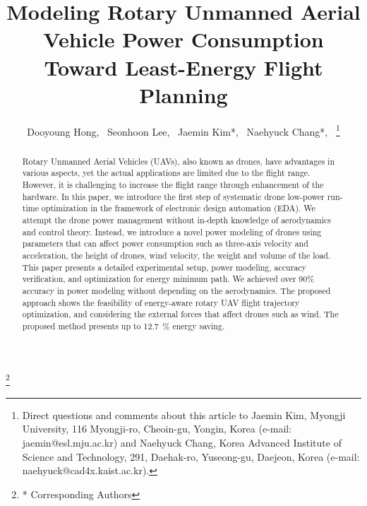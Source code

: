 \documentclass[journal]{./template/IEEEtran}
\begin{document}
\makeatletter

\newcommand\blfootnote[1]{%
  \begingroup
  \renewcommand\thefootnote{}\footnote{#1}%
  \addtocounter{footnote}{-1}%
  \endgroup
}

\newcommand\fs@norules{\def\@fs@cfont{\bfseries}\let\@fs@capt\floatc@ruled
  \def\@fs@pre{}%
  \def\@fs@post{}%
  \def\@fs@mid{\kern3pt}%
  \let\@fs@iftopcapt\iftrue}
\makeatother
{}

\title{Modeling Rotary Unmanned Aerial Vehicle Power Consumption Toward Least-Energy Flight Planning\\
}
\author{
Dooyoung Hong,~
Seonhoon Lee,~
Jaemin Kim*,~
Naehyuck Chang*,~
\thanks{Direct questions and comments about this article to Jaemin Kim, Myongji University, 116 Myongji-ro, Cheoin-gu, Yongin, Korea (e-mail: jaemin@esl.mju.ac.kr) and Naehyuck Chang, Korea Advanced Institute of Science and Technology, 291, Daehak-ro, Yuseong-gu, Daejeon, Korea (e-mail: naehyuck@cad4x.kaist.ac.kr).}

}
\maketitle
\blfootnote{* Corresponding Authors}

\begin{abstract}
Rotary Unmanned Aerial Vehicles (UAVs), also known as drones, have advantages in various aspects, yet the actual applications are limited due to the flight range. However, it is challenging to increase the flight range through enhancement of the hardware. 
In this paper, we introduce the first step of systematic drone low-power run-time optimization in the framework of electronic design automation (EDA). 
We attempt the drone power management without in-depth knowledge of aerodynamics and control theory. 
Instead, we introduce a novel power modeling of drones using parameters that can affect power consumption such as three-axis velocity and acceleration, the height of drones, wind velocity, the weight and volume of the load. 
This paper presents a detailed experimental setup, power modeling, accuracy verification, and optimization for energy minimum path. 
We achieved over 90\% accuracy in power modeling without depending on the aerodynamics. 
The proposed approach shows the feasibility of energy-aware rotary UAV flight trajectory optimization, and considering the external forces that affect drones such as wind. The proposed method presents up to 12.7~\% energy saving.
\label{Section: abstract}
\end{abstract}
\end{document}
